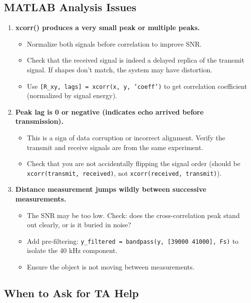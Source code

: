 \documentclass[11pt,letterpaper]{article}
\begin{document}
\subsection*{MATLAB Analysis Issues}

\begin{enumerate}
    \item \textbf{xcorr() produces a very small peak or multiple peaks.}
    \begin{itemize}
        \item Normalize both signals before correlation to improve SNR.
        \item Check that the received signal is indeed a delayed replica of the transmit signal. If shapes don't match, the system may have distortion.
        \item Use \texttt{[R\_xy, lags] = xcorr(x, y, 'coeff')} to get correlation coefficient (normalized by signal energy).
    \end{itemize}

    \item \textbf{Peak lag is 0 or negative (indicates echo arrived before transmission).}
    \begin{itemize}
        \item This is a sign of data corruption or incorrect alignment. Verify the transmit and receive signals are from the same experiment.
        \item Check that you are not accidentally flipping the signal order (should be \texttt{xcorr(transmit, received)}, not \texttt{xcorr(received, transmit)}).
    \end{itemize}

    \item \textbf{Distance measurement jumps wildly between successive measurements.}
    \begin{itemize}
        \item The SNR may be too low. Check: does the cross-correlation peak stand out clearly, or is it buried in noise?
        \item Add pre-filtering: \texttt{y\_filtered = bandpass(y, [39000 41000], Fs)} to isolate the 40 kHz component.
        \item Ensure the object is not moving between measurements.
    \end{itemize}
\end{enumerate}

\subsection*{When to Ask for TA Help}
\end{document}
